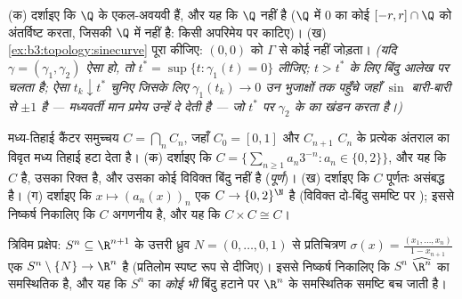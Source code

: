 \begin{exercise}[$\star\star$]\label{exo:b3:topology:9}
(क) दर्शाइए कि $\Q$ के  एकल-अवयवी हैं, और यह कि $\Q$
 नहीं है ($\Q$ में $0$ का कोई   $[-r, r]\cap\Q$
को अंतर्विष्ट करता, जिसकी $\Q$ में   नहीं है: किसी
अपरिमेय पर काटिए)।
(ख) \cref{ex:b3:topology:sinecurve} पूरा कीजिए: $(0,0)$ को $\Gamma$ से कोई  नहीं जोड़ता।
\emph{(यदि $\gamma = (\gamma_1, \gamma_2)$ ऐसा  हो, तो $t^* = \sup\{t : \gamma_1(t) = 0\}$ लीजिए; $t
> t^*$ के लिए बिंदु
आलेख पर चलता है; ऐसा $t_k \downarrow
t^*$ चुनिए जिसके लिए $\gamma_1(t_k) \to 0$ उन भुजाक्षों तक
पहुँचे जहाँ $\sin$ बारी-बारी से $\pm1$ है --- मध्यवर्ती मान प्रमेय
उन्हें दे देती है --- जो $t^*$ पर $\gamma_2$ के  का खंडन करता
है।)}
\end{exercise}

\begin{exercise}[$\star\star\star$]\label{exo:b3:topology:10}
मध्य-तिहाई कैंटर समुच्चय $C = \bigcap_n C_n$, जहाँ $C_0 =
[0,1]$ और $C_{n+1}$ $C_n$ के
प्रत्येक अंतराल का विवृत मध्य तिहाई हटा देता है।
(क) दर्शाइए कि $C = \bigl\{\sum_{n\geq1} a_n3^{-n} : a_n \in
\{0,2\}\bigr\}$, और यह कि $C$  है, उसका  रिक्त
है, और उसका कोई विविक्त बिंदु नहीं है (\emph{पूर्ण})।
(ख) दर्शाइए कि $C$ पूर्णतः असंबद्ध है।
(ग) दर्शाइए कि $x \mapsto (a_n(x))_n$ एक  $C \to
\{0,2\}^\N$ है (विविक्त दो-बिंदु
समष्टि पर ); इससे निष्कर्ष निकालिए कि $C$ अगणनीय
है, और यह कि $C \times C
\cong C$।
\end{exercise}

\begin{exercise}[$\star\star\star$]\label{exo:b3:topology:11}
त्रिविम प्रक्षेप: $S^n \subseteq \R^{n+1}$ के उत्तरी ध्रुव $N = (0, \dots,
0, 1)$ से प्रतिचित्रण
$\sigma(x) =
\frac{(x_1, \dots, x_n)}{1 - x_{n+1}}$ एक  $S^n
\setminus \{N\} \to \R^n$ है (प्रतिलोम स्पष्ट रूप से दीजिए)।
इससे निष्कर्ष निकालिए कि $S^n$  $\widehat{\R^n}$ का
समस्थितिक है, और यह कि $S^n$ का \emph{कोई भी} बिंदु हटाने पर
$\R^n$ के समस्थितिक समष्टि बच जाती है।
\end{exercise}

